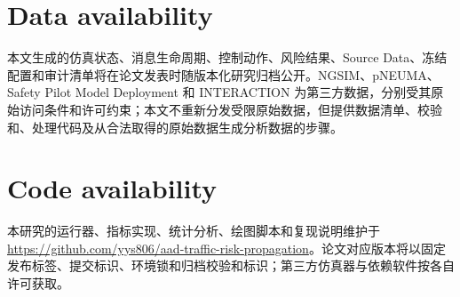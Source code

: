 \documentclass[10pt,a4paper,twocolumn]{article}
\begin{document}
\section*{Data availability}
本文生成的仿真状态、消息生命周期、控制动作、风险结果、Source Data、冻结配置和审计清单将在论文发表时随版本化研究归档公开。NGSIM、pNEUMA、Safety Pilot Model Deployment 和 INTERACTION 为第三方数据，分别受其原始访问条件和许可约束；本文不重新分发受限原始数据，但提供数据清单、校验和、处理代码及从合法取得的原始数据生成分析数据的步骤。

\section*{Code availability}
本研究的运行器、指标实现、统计分析、绘图脚本和复现说明维护于 \url{https://github.com/yys806/aad-traffic-risk-propagation}。论文对应版本将以固定发布标签、提交标识、环境锁和归档校验和标识；第三方仿真器与依赖软件按各自许可获取。
\end{document}
